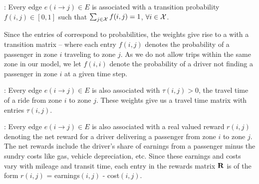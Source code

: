 
\begin{comment} %
\spara{Count matrix (\countmatrix)}: 
Every edge $e(i\rightarrow j) \in E$ is associated with an
integer-valued weight $c(i,j)$ that denotes the number of requests
at zone $i$ that had node $j$ as their destination.
\end{comment}

:
Every edge $e(i\rightarrow j) \in E$ is associated with a transition probability
$f(i, j) \in [0,1]$ such that
$\sum_{j \in \mathcal{X}} f(i,j) = 1$, $\forall i \in \mathcal{X}$.  

Since the entries of {\empiricaltransitionmatrix} correspond to probabilities, the weights 
give rise to a {\markovchain} with a transition matrix {\empiricaltransitionmatrix} -- 
where each entry $f(i,j)$ denotes the probability of a passenger in zone $i$
traveling to zone $j$. 
As we do not allow trips within the same zone in our model, we let $f(i,i)$ denote the probability of a driver not finding a passenger in zone $i$ at a
given time step.


:
Every edge $e(i\rightarrow j) \in E$ is also associated with  $\tau(i,j) > 0$, 
 the travel time of a ride from zone $i$ to zone $j$. 
These weights give us a travel time matrix {\traveltimematrix} with entries $\tau(i,j)$. 


:
Every edge $e(i \rightarrow j) \in E$ is also associated with a real valued reward $r(i,j)$ denoting
the net reward for a driver delivering a passenger from zone $i$ to zone $j$. The net rewards include the driver's
share of earnings from a passenger minus the sundry costs like gas, vehicle depreciation, etc.  Since these
earnings and costs vary with mileage and transit time, each entry in the rewards matrix ${\mathbf{R}}$ 
is of the form $r(i,j)$ = earnings$(i,j)$ - cost$(i,j)$.

